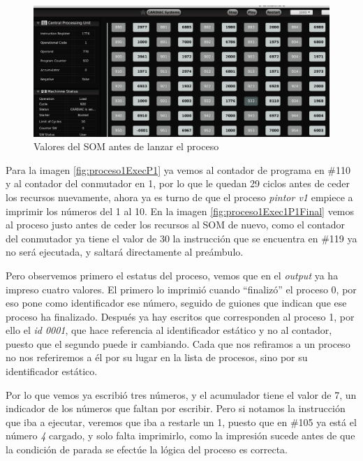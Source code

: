 \documentclass[letterpaper,12pt,oneside]{book}
\begin{document}
		\begin{figure}[h]		
			\centering
			\includegraphics[scale=0.4]{media/CARDIACC/LanzamientoExec1Prev.png}
			\caption{ Valores del SOM antes de lanzar el proceso}
			\label{fig:lanzaExec1Prev}
		\end{figure}		
		
		Para la imagen \ref{fig:proceso1ExecP1} ya vemos al contador de programa en \#110 y al contador del conmutador en 1, por lo que le quedan 29 ciclos antes 
		de ceder los recursos nuevamente, ahora ya es turno de que el proceso \textit{pintor v1} empiece a imprimir los números del 1 al 10. En la imagen
		\ref{fig:proceso1Exec1P1Final} vemos al proceso justo antes de ceder los recursos al SOM de nuevo, como el contador del conmutador ya tiene el valor de 30 la instrucción que se encuentra
		en \#119 ya no será ejecutada, y saltará directamente al preámbulo.
  
        Pero observemos primero el estatus del proceso, vemos que en
		el \textit{output} ya ha impreso cuatro valores. El primero lo imprimió cuando ``finalizó'' el proceso 0, por eso pone como identificador ese número,
		seguido de guiones que indican que ese proceso ha finalizado. Después ya hay escritos que corresponden al proceso 1, por ello el \textit{id 0001}, que hace
		referencia al identificador estático y no al contador, puesto que el segundo puede ir cambiando. Cada que nos refiramos a un proceso no nos referiremos
		a él por su lugar en la lista de procesos, sino por su identificador estático.
  
        Por lo que vemos ya escribió tres números, y el acumulador
		tiene el valor de 7, un indicador de los números que faltan por escribir. Pero si notamos la instrucción que iba a ejecutar, veremos que iba a restarle un
		1, puesto que en \#105 ya está el número \textit{4} cargado, y solo falta imprimirlo, como la impresión sucede antes de que la condición de parada se efectúe
		la lógica del proceso es correcta.
\end{document}
